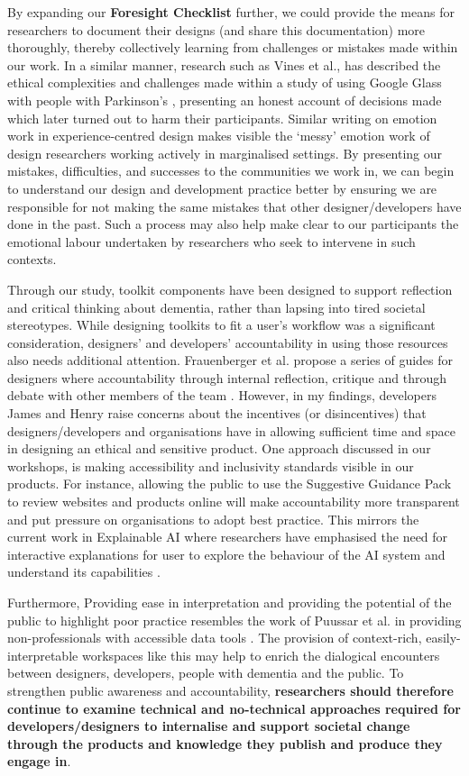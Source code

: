 By expanding our \textbf{Foresight Checklist} further, we could provide the means for researchers to document their designs (and share this documentation) more thoroughly, thereby collectively learning from challenges or mistakes made within our work. In a similar manner, research such as Vines et al., has described the ethical complexities and challenges made within a study of using Google Glass with people with Parkinson’s \citep{vines_our_2017}, presenting an honest account of decisions made which later turned out to harm their participants. Similar writing on emotion work in experience-centred design \citep{balaam_emotion_2019} makes visible the ‘messy’ emotion work of design researchers working actively in marginalised settings. By presenting our mistakes, difficulties, and successes to the communities we work in, we can begin to understand our design and development practice better by ensuring we are responsible for not making the same mistakes that other designer/developers have done in the past. Such a process may also help make clear to our participants the emotional labour undertaken by researchers who seek to intervene in such contexts.

Through our study, toolkit components have been designed to support reflection and critical thinking about dementia, rather than lapsing into tired societal stereotypes. While designing toolkits to fit a user’s workflow was a significant consideration, designers’ and developers’ accountability in using those resources also needs additional attention. Frauenberger et al. propose a series of guides for designers where accountability through internal reflection, critique and through debate with other members of the team \citep{frauenberger2015pursuit}. However, in my findings, developers James and Henry raise concerns about the incentives (or disincentives) that designers/developers and organisations have in allowing sufficient time and space in designing an ethical and sensitive product. One approach discussed in our workshops, is making accessibility and inclusivity standards visible in our products. For instance, allowing the public to use the Suggestive Guidance Pack to review websites and products online will make accountability more transparent and put pressure on organisations to adopt best practice. This mirrors the current work in Explainable AI where researchers have emphasised the need for interactive explanations for user to explore the behaviour of the AI system and understand its capabilities \citep{abdul2018trends}. 

Furthermore, Providing ease in interpretation and providing the potential of the public to highlight poor practice resembles the work of Puussar et al. in providing non-professionals with accessible data tools \citep{puussaar2018making}. The provision of context-rich, easily-interpretable workspaces like this may help to enrich the dialogical encounters between designers, developers, people with dementia and the public. To strengthen public awareness and accountability, \textbf{researchers should therefore continue to examine technical and no-technical approaches required for developers/designers to internalise and support societal change through the products and knowledge they publish and produce they engage in}.

